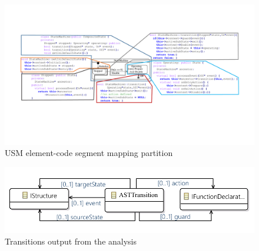 \begin{figure}
\centering
\includegraphics[clip, trim=1.8cm 5.55cm 2.1cm 3.8cm, width=1.8\columnwidth]{figures/bkwmapping.pdf}
\caption{USM element-code segment mapping partition} 
\label{fig:partition}
\end{figure}

\begin{figure}
\centering
\includegraphics[clip, trim=0cm 0.6cm 0.0cm 0.6cm, width=\columnwidth]{figures/asttransition}
\caption{Transitions output from the analysis} 
\label{fig:transitions}
\end{figure}

